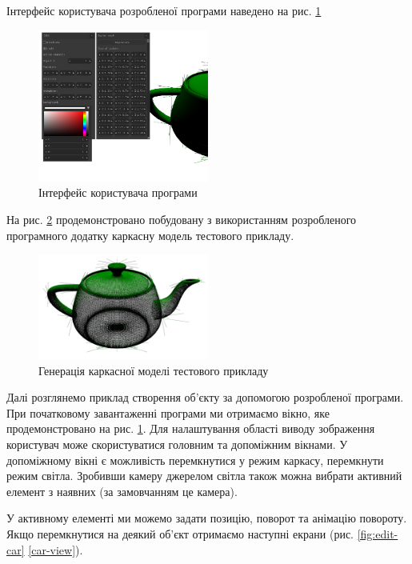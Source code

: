 \let\mypdfximage\pdfximage\def\pdfximage{\immediate\mypdfximage}\documentclass[14pt,a4paper]{extarticle}
\theoremstyle{definition}
\renewcommand{\[}{\begin{singlespace}\begin{equation*}}
\renewcommand{\]}{\end{equation*}\end{singlespace}}
\renewcommand{\+}{\discretionary{\mbox{\scriptsize$\hookleftarrow$}}{}{}}
\begin{document}
Інтерфейс користувача розробленої програми наведено на рис. \ref{fig:beginning-interface}

\begin{figure}[!htb]
    \centering
    \includegraphics[width=0.5\textwidth]{beginning-interface.png}
    \caption{Інтерфейс користувача програми}\label{fig:beginning-interface}
\end{figure}

На рис. \ref{fig:teapot-wireframe} продемонстровано побудовану з використанням розробленого програмного додатку каркасну модель тестового прикладу.

\begin{figure}[!htb]
    \centering
    \includegraphics[width=0.5\textwidth]{teapot-wireframe.png}
    \caption{Генерація каркасної моделі тестового прикладу}\label{fig:teapot-wireframe}
\end{figure}

Далі розглянемо приклад створення об'єкту за допомогою розробленої програми. При початковому завантаженні програми ми отримаємо вікно, яке продемонстровано на рис. \ref{fig:beginning-interface}. Для налаштування області виводу зображення користувач може скористуватися головним та допоміжним вікнами. У допоміжному вікні є можливість перемкнутися у режим каркасу, перемкнути режим світла. Зробивши камеру джерелом світла також можна вибрати активний елемент з наявних (за замовчанням це камера).

У активному елементі ми можемо задати позицію, поворот та анімацію повороту. Якщо перемкнутися на деякий об'єкт отримаємо наступні екрани (рис. \ref{fig:edit-car} \ref{car-view}).
\end{document}
